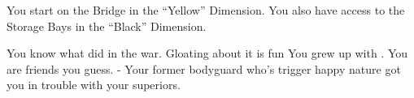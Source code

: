 \documentclass[char]{TMFHope}
\begin{document}
\begin{itemz}[Notes]
	\item You start on the Bridge in the ``Yellow'' Dimension. You also have access to the Storage Bays in the ``Black'' Dimension. 
\end{itemz}

\begin{contacts}
	\contact{\cXO{}} You know what \cXO{\they} did in the war. Gloating about it is fun
	\contact{\cMed{}} You grew up with \cMed{\them}. You are friends you guess.
	\contact{\cWeap{}} - Your former bodyguard who's trigger happy nature got you in trouble with your superiors.
\end{contacts}
\end{document}
